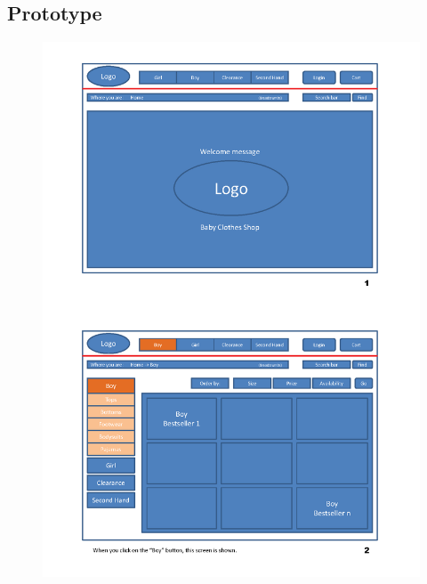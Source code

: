 \newpage

\subsection{Prototype}
\begin{figure}[H]
\begin{center}
\includegraphics[scale=0.77]{Prototype/HCI_Prototype_2_1_1.png}
\end{center}
\end{figure}
\newpage


\newpage

